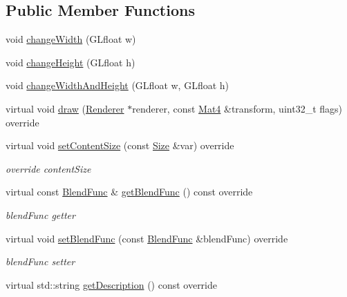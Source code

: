 \subsection*{Public Member Functions}
\begin{DoxyCompactItemize}
\item 
void \hyperlink{classLayerColor_af83dd9117f51a87589c5daf0c5993a58}{change\+Width} (G\+Lfloat w)
\item 
void \hyperlink{classLayerColor_a332b62f7f0156415544fa0c53d851692}{change\+Height} (G\+Lfloat h)
\item 
void \hyperlink{classLayerColor_a798a5f19b6961adc375079909943ec84}{change\+Width\+And\+Height} (G\+Lfloat w, G\+Lfloat h)
\item 
virtual void \hyperlink{classLayerColor_ac36be7e85a4e14c1c043598c772f67e4}{draw} (\hyperlink{classRenderer}{Renderer} $\ast$renderer, const \hyperlink{classMat4}{Mat4} \&transform, uint32\+\_\+t flags) override
\item 
\mbox{\label{classLayerColor_a066da112c29c206c4638f84b5d3a9f37}} 
virtual void \hyperlink{classLayerColor_a066da112c29c206c4638f84b5d3a9f37}{set\+Content\+Size} (const \hyperlink{classSize}{Size} \&var) override
\begin{DoxyCompactList}\small\item\em override content\+Size \end{DoxyCompactList}\item 
virtual const \hyperlink{structBlendFunc}{Blend\+Func} \& \hyperlink{classLayerColor_aa5c1889712def2a289d90ad3c08572fc}{get\+Blend\+Func} () const override
\begin{DoxyCompactList}\small\item\em blend\+Func getter \end{DoxyCompactList}\item 
virtual void \hyperlink{classLayerColor_ae71bee82fac9f5b984a6fdaf69c97d73}{set\+Blend\+Func} (const \hyperlink{structBlendFunc}{Blend\+Func} \&blend\+Func) override
\begin{DoxyCompactList}\small\item\em blend\+Func setter \end{DoxyCompactList}\item 
virtual std\+::string \hyperlink{classLayerColor_aae6932d9d9e0ae21cc34e1e37d0b2d92}{get\+Description} () const override
\item 
\mbox{\label{classLayerColor_a21031983a964afaf67dc5239af5c7f97}} 

\end{DoxyCompactItemize}
